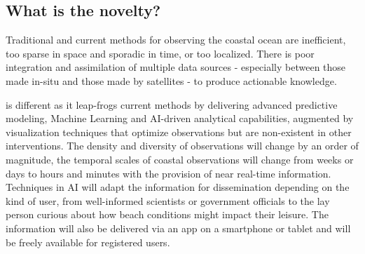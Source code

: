 



\vspace*{-0.2cm}
\subsection{What is the novelty?}

Traditional  and  current  methods  for  observing  the  coastal
ocean  are  inefficient,  too sparse in space and sporadic in time, or
too localized. There is poor integration and assimilation of multiple
data sources - especially between those made in-situ and those made by
satellites - to produce actionable knowledge.


\pro is different as it leap-frogs current methods by delivering
advanced predictive modeling, Machine Learning and AI-driven
analytical capabilities, augmented by visualization techniques that
optimize observations but are non-existent in other interventions. The
density and diversity of observations will change by an order of
magnitude, the temporal scales of coastal observations will change
from weeks or days to hours and minutes with the provision of near
real-time information. Techniques in AI will adapt the information for
dissemination depending on the kind of user, from well-informed
scientists or government officials to the lay person curious about how
beach conditions might impact their leisure. The information will also
be delivered via an app on a smartphone or tablet and will be freely
available for registered users. %


